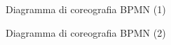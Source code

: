 \documentclass[11pt]{article} %
\begin{document}
\begin{figure}[!ht]
\begin{center}
\caption{Diagramma di coreografia BPMN (1)}
\end{center}
\end{figure}

\begin{figure}[!ht]
\begin{center}
\caption{Diagramma di coreografia BPMN (2)}
\end{center}
\end{figure}
\end{document}
